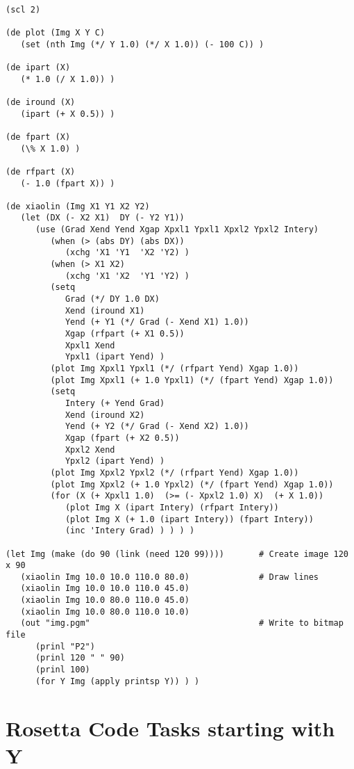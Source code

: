 \begin{verbatim}

(scl 2)

(de plot (Img X Y C)
   (set (nth Img (*/ Y 1.0) (*/ X 1.0)) (- 100 C)) )

(de ipart (X)
   (* 1.0 (/ X 1.0)) )

(de iround (X)
   (ipart (+ X 0.5)) )

(de fpart (X)
   (\% X 1.0) )

(de rfpart (X)
   (- 1.0 (fpart X)) )

(de xiaolin (Img X1 Y1 X2 Y2)
   (let (DX (- X2 X1)  DY (- Y2 Y1))
      (use (Grad Xend Yend Xgap Xpxl1 Ypxl1 Xpxl2 Ypxl2 Intery)
         (when (> (abs DY) (abs DX))
            (xchg 'X1 'Y1  'X2 'Y2) )
         (when (> X1 X2)
            (xchg 'X1 'X2  'Y1 'Y2) )
         (setq
            Grad (*/ DY 1.0 DX)
            Xend (iround X1)
            Yend (+ Y1 (*/ Grad (- Xend X1) 1.0))
            Xgap (rfpart (+ X1 0.5))
            Xpxl1 Xend
            Ypxl1 (ipart Yend) )
         (plot Img Xpxl1 Ypxl1 (*/ (rfpart Yend) Xgap 1.0))
         (plot Img Xpxl1 (+ 1.0 Ypxl1) (*/ (fpart Yend) Xgap 1.0))
         (setq
            Intery (+ Yend Grad)
            Xend (iround X2)
            Yend (+ Y2 (*/ Grad (- Xend X2) 1.0))
            Xgap (fpart (+ X2 0.5))
            Xpxl2 Xend
            Ypxl2 (ipart Yend) )
         (plot Img Xpxl2 Ypxl2 (*/ (rfpart Yend) Xgap 1.0))
         (plot Img Xpxl2 (+ 1.0 Ypxl2) (*/ (fpart Yend) Xgap 1.0))
         (for (X (+ Xpxl1 1.0)  (>= (- Xpxl2 1.0) X)  (+ X 1.0))
            (plot Img X (ipart Intery) (rfpart Intery))
            (plot Img X (+ 1.0 (ipart Intery)) (fpart Intery))
            (inc 'Intery Grad) ) ) ) )

(let Img (make (do 90 (link (need 120 99))))       # Create image 120 x 90
   (xiaolin Img 10.0 10.0 110.0 80.0)              # Draw lines
   (xiaolin Img 10.0 10.0 110.0 45.0)
   (xiaolin Img 10.0 80.0 110.0 45.0)
   (xiaolin Img 10.0 80.0 110.0 10.0)
   (out "img.pgm"                                  # Write to bitmap file
      (prinl "P2")
      (prinl 120 " " 90)
      (prinl 100)
      (for Y Img (apply printsp Y)) ) )

\end{verbatim}

\chapter{Rosetta Code Tasks starting with Y}

